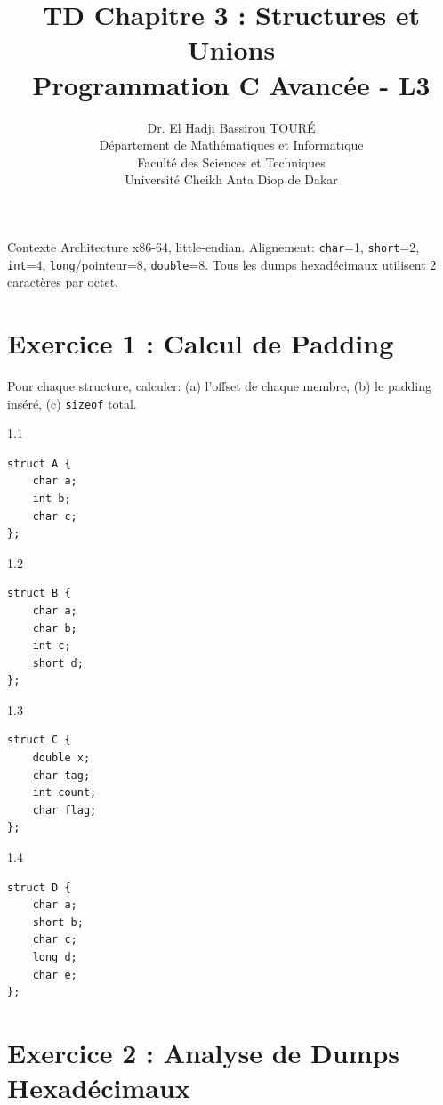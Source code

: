 \documentclass[10pt,a4paper]{article}
\title{\textbf{TD Chapitre 3 : Structures et Unions}\\
\large Programmation C Avancée - L3}
\author{Dr. El Hadji Bassirou TOURÉ\\
Département de Mathématiques et Informatique\\
Faculté des Sciences et Techniques\\
Université Cheikh Anta Diop de Dakar}
\date{}
\begin{document}
\maketitle

\begin{infobox}{Contexte}
Architecture x86-64, little-endian. Alignement: \texttt{char}=1, \texttt{short}=2, \texttt{int}=4, \texttt{long}/pointeur=8, \texttt{double}=8. Tous les dumps hexadécimaux utilisent 2 caractères par octet.
\end{infobox}

\section{Exercice 1 : Calcul de Padding}

Pour chaque structure, calculer: (a) l'offset de chaque membre, (b) le padding inséré, (c) \texttt{sizeof} total.

\begin{exercicebox}{1.1}
\begin{lstlisting}
struct A {
    char a;
    int b;
    char c;
};
\end{lstlisting}
\end{exercicebox}

\begin{exercicebox}{1.2}
\begin{lstlisting}
struct B {
    char a;
    char b;
    int c;
    short d;
};
\end{lstlisting}
\end{exercicebox}

\begin{exercicebox}{1.3}
\begin{lstlisting}
struct C {
    double x;
    char tag;
    int count;
    char flag;
};
\end{lstlisting}
\end{exercicebox}

\begin{exercicebox}{1.4}
\begin{lstlisting}
struct D {
    char a;
    short b;
    char c;
    long d;
    char e;
};
\end{lstlisting}
\end{exercicebox}

\section{Exercice 2 : Analyse de Dumps Hexadécimaux}
\end{document}
